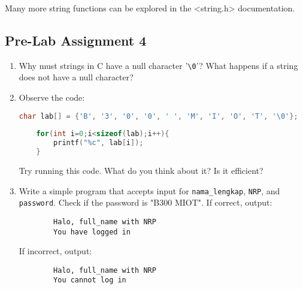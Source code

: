 Many more string functions can be explored in the <string.h> documentation.

\subsection*{Pre-Lab Assignment 4}
\begin{enumerate}
	\item Why must strings in C have a null character '\verb|\0|'? What happens if a string does not have a null character?
	\item Observe the code:
	\begin{lstlisting}[language=c]
	char lab[] = {'B', '3', '0', '0', ' ', 'M', 'I', 'O', 'T', '\0'};
	
	for(int i=0;i<sizeof(lab);i++){
		printf("%c", lab[i]);
	}	
	\end{lstlisting}
	Try running this code. What do you think about it? Is it efficient?
	\item Write a simple program that accepts input for \verb|nama_lengkap|, \verb|NRP|, and \verb|password|.  
	Check if the password is "B300 MIOT".  
	If correct, output:
	\begin{verbatim}
		Halo, full_name with NRP
		You have logged in
	\end{verbatim}
	If incorrect, output:
	\begin{verbatim}
		Halo, full_name with NRP
		You cannot log in
	\end{verbatim}
\end{enumerate}

